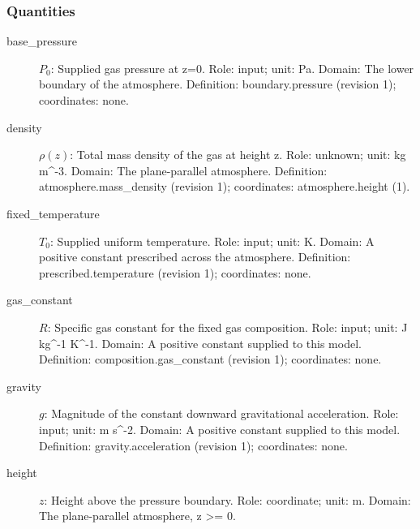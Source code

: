 \subsubsection*{Quantities}
\begin{description}
\item[base\_pressure] $P_0$: Supplied gas pressure at z=0.
\newline Role: input; unit: Pa.
\newline Domain: The lower boundary of the atmosphere.
\newline Definition: boundary.pressure (revision 1); coordinates: none.
\item[density] $\rho(z)$: Total mass density of the gas at height z.
\newline Role: unknown; unit: kg m\textasciicircum{}-3.
\newline Domain: The plane-parallel atmosphere.
\newline Definition: atmosphere.mass\_density (revision 1); coordinates: atmosphere.height (1).
\item[fixed\_temperature] $T_0$: Supplied uniform temperature.
\newline Role: input; unit: K.
\newline Domain: A positive constant prescribed across the atmosphere.
\newline Definition: prescribed.temperature (revision 1); coordinates: none.
\item[gas\_constant] $R$: Specific gas constant for the fixed gas composition.
\newline Role: input; unit: J kg\textasciicircum{}-1 K\textasciicircum{}-1.
\newline Domain: A positive constant supplied to this model.
\newline Definition: composition.gas\_constant (revision 1); coordinates: none.
\item[gravity] $g$: Magnitude of the constant downward gravitational acceleration.
\newline Role: input; unit: m s\textasciicircum{}-2.
\newline Domain: A positive constant supplied to this model.
\newline Definition: gravity.acceleration (revision 1); coordinates: none.
\item[height] $z$: Height above the pressure boundary.
\newline Role: coordinate; unit: m.
\newline Domain: The plane-parallel atmosphere, z \textgreater{}= 0.

\end{description}
